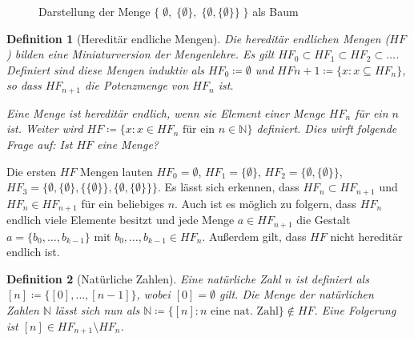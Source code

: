\documentclass[german]{article}
\theoremstyle{break}
\theoremstyle{def_style}
\newtheorem{definition}{Definition}[section]
\theoremstyle{def_style}
\theoremstyle{lemma_style}
\begin{document}
\begin{figure}[h]
	\begin{center}
	\end{center}
\caption{Darstellung der Menge $\{\; \emptyset, \; \{\emptyset\}, \; \{\emptyset,\{\emptyset\}\}\;\}$ als Baum}
\label{Mengenbaum}
\end{figure}

\begin{definition}[Hereditär endliche Mengen]
	Die \textit{hereditär endlichen Mengen} ($HF$) bilden eine Miniaturversion der Mengenlehre. Es gilt $HF_0\subset HF_1 \subset HF_2 \subset \dots$. Definiert sind diese Mengen induktiv als $HF_0\coloneqq \emptyset$ und $HF{n+1}\coloneqq \{x : x\subseteq HF_n\}$, so dass $HF_{n+1}$ die Potenzmenge von $HF_n$ ist.
	
	Eine Menge ist hereditär endlich, wenn sie Element einer Menge $HF_n$ für ein $n$ ist. Weiter wird $HF\coloneqq\{x : x \in HF_n \text{ für ein }n\in \mathbb{N}\}$ definiert.
	Dies wirft folgende Frage auf: Ist $HF$ eine Menge? 
\end{definition}

Die ersten $HF$ Mengen lauten $HF_0=\emptyset$, $HF_1=\{\emptyset\}$, $HF_2=\{\emptyset,\{\emptyset\}\}$, \\ $HF_3=\{\emptyset, \{\emptyset\}, \{\{\emptyset\}\}, \{\emptyset,\{\emptyset\}\}\}$. Es lässt sich erkennen, dass $HF_n\subset HF_{n+1}$ und $HF_n\in HF_{n+1}$ für ein beliebiges $n$. Auch ist es möglich zu folgern, dass $HF_n$ endlich viele Elemente besitzt und jede Menge $a\in HF_{n+1}$ die Gestalt $a=\{b_0,\dots,b_{k-1}\}$ mit $b_0,\dots,b_{k-1}\in HF_n$. Außerdem gilt, dass $HF$ nicht hereditär endlich ist.

\begin{definition}[Natürliche Zahlen]
	Eine \textit{natürliche Zahl} $n$ ist definiert als $[n]\coloneqq\{[0],\dots,[n-1]\}$, wobei $[0]=\emptyset$ gilt. Die Menge der natürlichen Zahlen $\mathbb{N}$ lässt sich nun als $\mathbb{N}\coloneqq\{[n] : n \text{ eine nat. Zahl}\} \notin HF$. Eine Folgerung ist $[n]\in HF_{n+1}\setminus HF_n$.
\end{definition}
\end{document}
